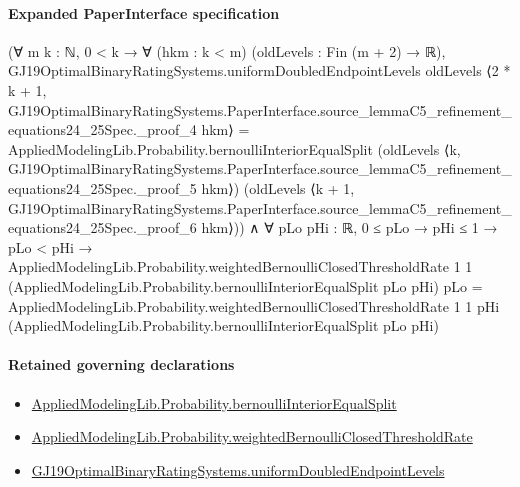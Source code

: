\documentclass[10pt]{article}
\begin{document}
\paragraph{Expanded PaperInterface specification}
\begin{ReviewVerbatim}
(∀ {m k : ℕ},
    0 < k →
      ∀ (hkm : k < m) (oldLevels : Fin (m + 2) → ℝ),
        GJ19OptimalBinaryRatingSystems.uniformDoubledEndpointLevels oldLevels
            ⟨2 * k + 1,
              GJ19OptimalBinaryRatingSystems.PaperInterface.source_lemmaC5_refinement_equations24_25Spec._proof_4 hkm⟩ =
          AppliedModelingLib.Probability.bernoulliInteriorEqualSplit
            (oldLevels
              ⟨k,
                GJ19OptimalBinaryRatingSystems.PaperInterface.source_lemmaC5_refinement_equations24_25Spec._proof_5
                  hkm⟩)
            (oldLevels
              ⟨k + 1,
                GJ19OptimalBinaryRatingSystems.PaperInterface.source_lemmaC5_refinement_equations24_25Spec._proof_6
                  hkm⟩)) ∧
  ∀ {pLo pHi : ℝ},
    0 ≤ pLo →
      pHi ≤ 1 →
        pLo < pHi →
          AppliedModelingLib.Probability.weightedBernoulliClosedThresholdRate 1 1
              (AppliedModelingLib.Probability.bernoulliInteriorEqualSplit pLo pHi) pLo =
            AppliedModelingLib.Probability.weightedBernoulliClosedThresholdRate 1 1 pHi
              (AppliedModelingLib.Probability.bernoulliInteriorEqualSplit pLo pHi)
\end{ReviewVerbatim}

\paragraph{Retained governing declarations}
\begin{itemize}\raggedright
\item \hyperlink{governing-declaration-6fd223adffc776ff}{Applied\allowbreak{}Modeling\allowbreak{}Lib.\allowbreak{}Probability.\allowbreak{}bernoulli\allowbreak{}Interior\allowbreak{}Equal\allowbreak{}Split}
\item \hyperlink{governing-declaration-40edb12d31a5e6d9}{Applied\allowbreak{}Modeling\allowbreak{}Lib.\allowbreak{}Probability.\allowbreak{}weighted\allowbreak{}Bernoulli\allowbreak{}Closed\allowbreak{}Threshold\allowbreak{}Rate}
\item \hyperlink{governing-declaration-a6f787e3a999e2da}{GJ19\allowbreak{}Optimal\allowbreak{}Binary\allowbreak{}Rating\allowbreak{}Systems.\allowbreak{}uniform\allowbreak{}Doubled\allowbreak{}Endpoint\allowbreak{}Levels}
\end{itemize}
\end{document}
